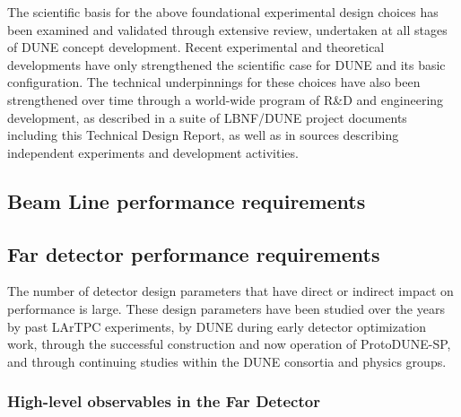 The scientific basis for the above foundational experimental
design choices has been examined and validated through extensive
review, undertaken at all stages of DUNE concept development.
Recent experimental and theoretical developments have only
strengthened the scientific case for DUNE and its
basic configuration.  The technical underpinnings for
these choices have also been strengthened over time through a world-wide
program of R\&D and engineering development, as described in a suite
of LBNF/DUNE project documents including this Technical Design Report, as
well as in sources describing independent experiments and development
activities.

%

\subsection{Beam Line performance requirements}



\subsection{Far detector performance requirements}

The number of detector design parameters that have direct
or indirect impact on performance is large.  These design
parameters have been studied over the years by past LArTPC
experiments, by DUNE during early detector optimization work,
through the successful construction and now operation of
ProtoDUNE-SP, and through continuing studies within the
DUNE consortia and physics groups.

\subsubsection{High-level observables in the Far Detector}

